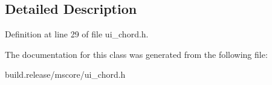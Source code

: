 \subsection{Detailed Description}


Definition at line 29 of file ui\+\_\+chord.\+h.



The documentation for this class was generated from the following file\+:\begin{DoxyCompactItemize}
\item 
build.\+release/mscore/ui\+\_\+chord.\+h\end{DoxyCompactItemize}
